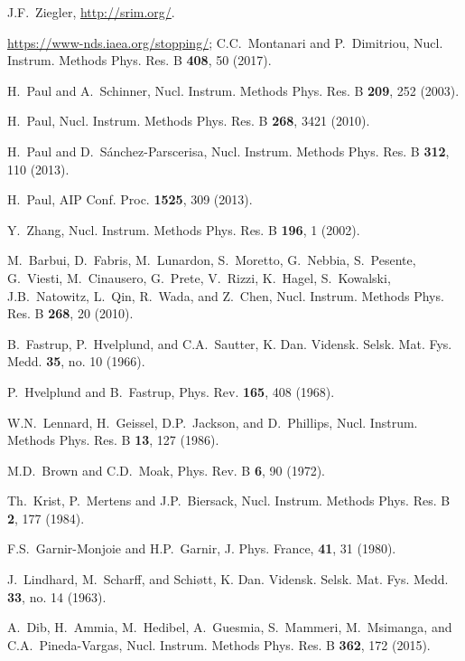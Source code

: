 \documentclass[aps,pra,twocolumn,amsmath,amssymb,floatfix]{revtex4-2}
\begin{document}
\begin{thebibliography}{99}

 J.F.~Ziegler, \url{http://srim.org/}.

 \url{https://www-nds.iaea.org/stopping/};
 C.C.~Montanari and P.~Dimitriou,
 Nucl. Instrum. Methods Phys. Res. B \textbf{408}, 50 (2017).

 H.~Paul and A.~Schinner,
 Nucl. Instrum. Methods Phys. Res. B \textbf{209}, 252 (2003).

 H.~Paul,
 Nucl. Instrum. Methods Phys. Res. B \textbf{268}, 3421 (2010).

 H.~Paul and D.~S\'{a}nchez-Parscerisa,
 Nucl. Instrum. Methods Phys. Res. B \textbf{312}, 110 (2013).

 H.~Paul,
 AIP Conf. Proc. \textbf{1525}, 309 (2013).

 Y.~Zhang,
 Nucl. Instrum. Methods Phys. Res. B \textbf{196}, 1 (2002).

 M.~Barbui, D.~Fabris, M.~Lunardon, S.~Moretto, G.~Nebbia, S.~Pesente, G.~Viesti, M.~Cinausero, G.~Prete, V.~Rizzi, K.~Hagel, S.~Kowalski, J.B.~Natowitz, L.~Qin, R.~Wada, and Z.~Chen,
 Nucl. Instrum. Methods Phys. Res. B \textbf{268}, 20 (2010).

 B.~Fastrup, P.~Hvelplund, and C.A.~Sautter,
 K. Dan. Vidensk. Selsk. Mat. Fys. Medd. \textbf{35}, no. 10 (1966).

 P.~Hvelplund and B.~Fastrup,
 Phys. Rev. \textbf{165}, 408 (1968).

 W.N.~Lennard, H.~Geissel, D.P.~Jackson, and D.~Phillips,
 Nucl. Instrum. Methods Phys. Res. B \textbf{13}, 127 (1986).

 M.D.~Brown and C.D.~Moak,
 Phys. Rev. B \textbf{6}, 90 (1972).

 Th.~Krist, P.~Mertens and J.P.~Biersack,
 Nucl. Instrum. Methods Phys. Res. B \textbf{2}, 177 (1984).

 F.S.~Garnir-Monjoie and H.P.~Garnir,
 J. Phys. France, \textbf{41}, 31 (1980).

 J.~Lindhard, M.~Scharff, and Schi{\o}tt,
 K. Dan. Vidensk. Selsk. Mat. Fys. Medd. \textbf{33}, no. 14 (1963).

 A.~Dib, H.~Ammia, M.~Hedibel, A.~Guesmia, S.~Mammeri, M.~Msimanga, and C.A.~Pineda-Vargas,
 Nucl. Instrum. Methods Phys. Res. B \textbf{362}, 172 (2015).


\end{thebibliography}
\end{document}
